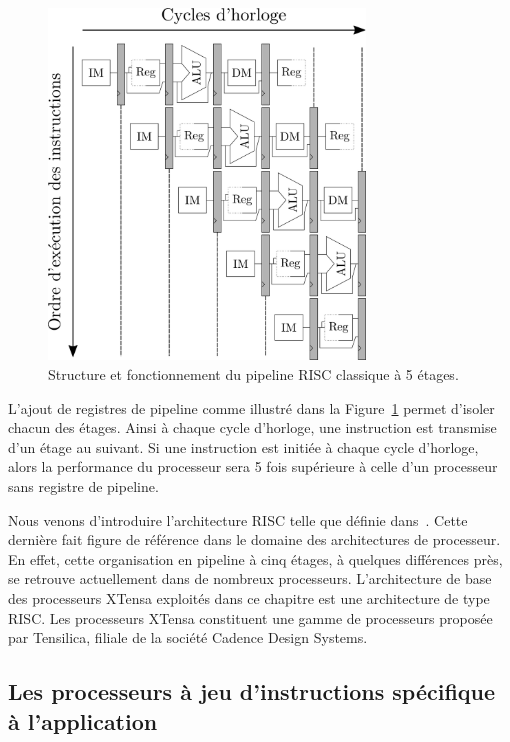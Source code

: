 \begin{figure}[t]
\centering
\includegraphics[width=0.75\textwidth]{main/ch3_fig/pipelines}
\caption{Structure et fonctionnement du pipeline RISC classique à 5 étages.}
\label{fig:pipelines}
\end{figure}


L'ajout de registres de pipeline comme illustré dans la Figure~\ref{fig:pipelines} permet d'isoler chacun des étages. Ainsi à chaque cycle d'horloge, une instruction est transmise d'un étage au suivant. Si une instruction est initiée à chaque cycle d'horloge, alors la performance du processeur sera 5 fois supérieure à celle d'un processeur sans registre de pipeline.

Nous venons d'introduire l'architecture RISC telle que définie dans~\cite{hennessy2011computer}. Cette dernière fait figure de référence dans le domaine des architectures de processeur. En effet, cette organisation en pipeline à cinq étages, à quelques différences près, se retrouve actuellement dans de nombreux processeurs. L'architecture de base des processeurs XTensa exploités dans ce chapitre est une architecture de type RISC. Les processeurs XTensa constituent une gamme de processeurs proposée par Tensilica, filiale de la société Cadence Design Systems.

\subsection{Les processeurs à jeu d'instructions spécifique à l'application}

